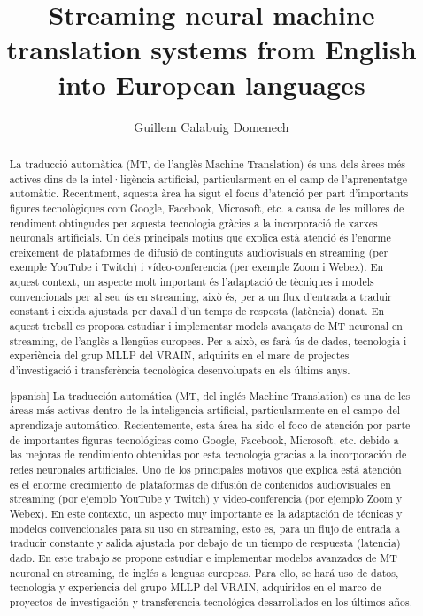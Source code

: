 \documentclass[11pt,english,listoffigures,listoftables]{tfgetsinf}
\title{Streaming neural machine translation systems from English into European languages}
\author{Guillem Calabuig Domenech}
\begin{document}

\begin{abstract}
La traducció automàtica (MT, de l’anglès Machine Translation) és una dels àrees més
actives dins de la intel·ligència artificial, particularment en el camp de l’aprenentatge
automàtic. Recentment, aquesta àrea ha sigut el focus d’atenció per part d’importants
figures tecnològiques com Google, Facebook, Microsoft, etc. a causa de les millores de
rendiment obtingudes per aquesta tecnologia gràcies a la incorporació de xarxes neuronals artificials. Un dels principals motius que explica està atenció és l’enorme creixement
de plataformes de difusió de continguts audiovisuals en streaming (per exemple YouTube
i Twitch) i vídeo-conferencia (per exemple Zoom i Webex). En aquest context, un aspecte
molt important és l’adaptació de tècniques i models convencionals per al seu ús en streaming, això és, per a un flux d’entrada a traduir constant i eixida ajustada per davall d’un
temps de resposta (latència) donat. En aquest treball es proposa estudiar i implementar
models avançats de MT neuronal en streaming, de l'anglès a llengües europees. Per a
això, es farà ús de dades, tecnologia i experiència del grup MLLP del VRAIN, adquirits
en el marc de projectes d’investigació i transferència tecnològica desenvolupats en els
últims anys.
\end{abstract}
\begin{abstract}[spanish]
La traducción automática (MT, del inglés Machine Translation) es una de les áreas más activas dentro de la inteligencia artificial, particularmente en el campo del aprendizaje automático. Recientemente, esta área ha sido el foco de atención por parte de importantes figuras tecnológicas como Google, Facebook, Microsoft, etc. debido a las mejoras de rendimiento obtenidas por esta tecnología gracias a la incorporación de redes neuronales artificiales. Uno de los principales motivos que explica está atención es el enorme crecimiento de plataformas de difusión de contenidos audiovisuales en streaming (por ejemplo YouTube y Twitch) y video-conferencia (por ejemplo Zoom y Webex). En este contexto, un aspecto muy importante es la adaptación de técnicas y modelos convencionales para su uso en streaming, esto es, para un flujo de entrada a traducir constante y salida ajustada por debajo de un tiempo de respuesta (latencia) dado. En este trabajo se propone estudiar e implementar modelos avanzados de MT neuronal en streaming, de inglés a lenguas europeas. Para ello, se hará uso de datos, tecnología y experiencia del grupo MLLP del VRAIN, adquiridos en el marco de proyectos de investigación y transferencia tecnológica desarrollados en los últimos años.
\end{abstract}
\end{document}
